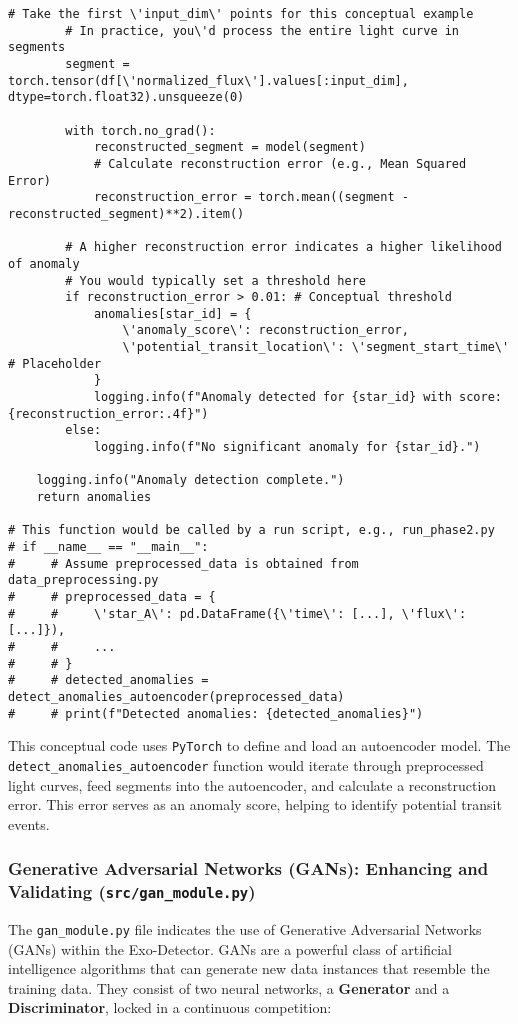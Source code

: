 \documentclass{article}
\begin{document}
\begin{lstlisting}[caption={Conceptual Anomaly Detection Logic}]
        # Take the first \'input_dim\' points for this conceptual example
        # In practice, you\'d process the entire light curve in segments
        segment = torch.tensor(df[\'normalized_flux\'].values[:input_dim], dtype=torch.float32).unsqueeze(0)

        with torch.no_grad():
            reconstructed_segment = model(segment)
            # Calculate reconstruction error (e.g., Mean Squared Error)
            reconstruction_error = torch.mean((segment - reconstructed_segment)**2).item()

        # A higher reconstruction error indicates a higher likelihood of anomaly
        # You would typically set a threshold here
        if reconstruction_error > 0.01: # Conceptual threshold
            anomalies[star_id] = {
                \'anomaly_score\': reconstruction_error,
                \'potential_transit_location\': \'segment_start_time\' # Placeholder
            }
            logging.info(f"Anomaly detected for {star_id} with score: {reconstruction_error:.4f}")
        else:
            logging.info(f"No significant anomaly for {star_id}.")

    logging.info("Anomaly detection complete.")
    return anomalies

# This function would be called by a run script, e.g., run_phase2.py
# if __name__ == "__main__":
#     # Assume preprocessed_data is obtained from data_preprocessing.py
#     # preprocessed_data = {
#     #     \'star_A\': pd.DataFrame({\'time\': [...], \'flux\': [...]}),
#     #     ...
#     # }
#     # detected_anomalies = detect_anomalies_autoencoder(preprocessed_data)
#     # print(f"Detected anomalies: {detected_anomalies}")
\end{lstlisting}

This conceptual code uses \texttt{PyTorch} to define and load an autoencoder model. The \texttt{detect\_anomalies\_autoencoder} function would iterate through preprocessed light curves, feed segments into the autoencoder, and calculate a reconstruction error. This error serves as an anomaly score, helping to identify potential transit events.

\subsubsection{Generative Adversarial Networks (GANs): Enhancing and Validating (\texttt{src/gan\_module.py})}

The \texttt{gan\_module.py} file indicates the use of Generative Adversarial Networks (GANs) within the Exo-Detector. GANs are a powerful class of artificial intelligence algorithms that can generate new data instances that resemble the training data. They consist of two neural networks, a \textbf{Generator} and a \textbf{Discriminator}, locked in a continuous competition:
\end{document}
